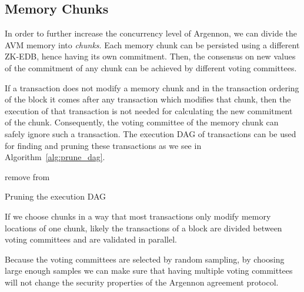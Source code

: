 \documentclass[11pt, A4]{report}
\begin{document}
    \subsection{Memory Chunks}\label{subsec:memory-chunks}

    In order to further increase the concurrency level of Argennon, we can divide the AVM memory into \emph{chunks}.
    Each memory chunk can be persisted using a different ZK-EDB, hence having its own commitment. Then, the
    consensus on new values of the commitment of any chunk can be achieved by different voting committees.

    If a transaction does not modify a memory chunk and in the transaction ordering of the block it comes after
    any transaction which modifies that chunk, then the execution of that transaction is not needed for calculating
    the new commitment of the chunk. Consequently, the voting committee of the memory chunk can safely ignore such a
    transaction. The execution DAG of transactions can be used for finding and pruning these transactions as
    we see in Algorithm~\ref{alg:prune_dag}.

    \begin{algorithm}
        \DontPrintSemicolon
        \BlankLine
        {
            \RPrune{\V}\;
        }
        \BlankLine
        \Fn{\RPrune{\V}}
        {
            {
                remove \V from \Graph\;
                {
                    \;
                }
            }
        }
        \caption{Pruning the execution DAG}\label{alg:prune_dag}
    \end{algorithm}

    If we choose chunks in a way that most transactions only modify memory locations of one chunk,
    likely the transactions of a block are divided between voting committees and are validated in parallel.

    Because the voting committees are selected by random sampling, by choosing large enough samples we can make sure
    that having multiple voting committees will not change the security properties of the Argennon agreement protocol.
\end{document}

